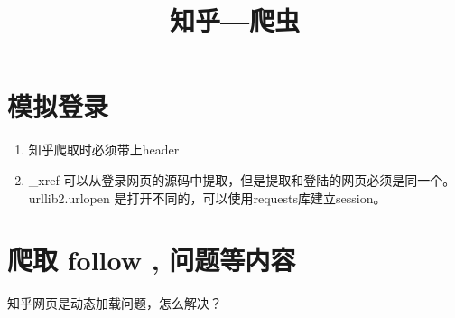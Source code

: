 \documentclass{article}
\title{知乎---爬虫}
\begin{document}
   \maketitle
   \section{模拟登录} 
  \begin{enumerate}
    \item 知乎爬取时必须带上header
    \item \_xref 可以从登录网页的源码中提取，但是提取和登陆的网页必须是同一个。urllib2.urlopen 是打开不同的，可以使用requests库建立session。
  \end{enumerate}

    \section{爬取 follow , 问题等内容}
    知乎网页是动态加载问题，怎么解决？
      
    
\end{document}
